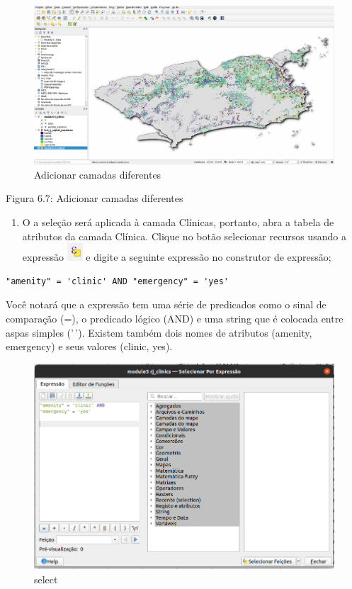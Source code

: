 \documentclass[
  portuguese,
]{krantz}
\providecommand{\tightlist}{%
  \setlength{\itemsep}{0pt}\setlength{\parskip}{0pt}}
\begin{document}
\begin{figure}
\centering
\includegraphics{media/modulo6/add-layers.png}
\caption{Adicionar camadas diferentes}
\end{figure}

Figura 6.7: Adicionar camadas diferentes

\begin{enumerate}
\def\labelenumi{\arabic{enumi}.}
\setcounter{enumi}{1}
\tightlist
\item
  O a seleção será aplicada à camada Clínicas, portanto, abra a tabela de atributos da camada Clínica. Clique no botão selecionar recursos usando a expressão \includegraphics{media/modulo6/select_features_button.png} e digite a seguinte expressão no construtor de expressão;
\end{enumerate}

\begin{verbatim}
"amenity" = 'clinic' AND "emergency" = 'yes'
\end{verbatim}

Você notará que a expressão tem uma série de predicados como o sinal de comparação (=), o predicado lógico (AND) e uma string que é colocada entre aspas simples ('\,'). Existem também dois nomes de atributos (amenity, emergency) e seus valores (clinic, yes).

\begin{figure}
\centering
\includegraphics{media/modulo6/select.png}
\caption{select}
\end{figure}
\end{document}

